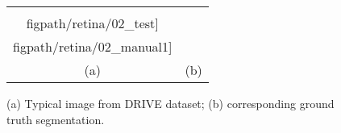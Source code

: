 \begin{figure}
\centering
\begin{tabular}{c c}
\texttt{[image: \\figpath/retina/02\_test]} &
\texttt{[image: \\figpath/retina/02\_manual1]} \\
(a) & (b) \\
\end{tabular}
%
\caption{(a) Typical image from DRIVE dataset; (b) corresponding ground truth segmentation.}
\label{f:drive_examples}
\end{figure}
